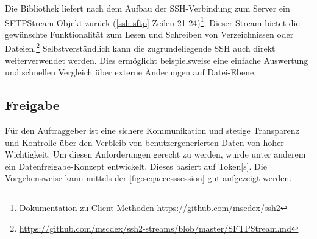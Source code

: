 

Die Bibliothek liefert nach dem Aufbau der \gls{SSH}-Verbindung zum Server ein \gls{SFTP}\gls{Stream}-Objekt zurück (\autoref{ssh-sftp} Zeilen 21-24)\footnote{Dokumentation zu Client-Methoden \url{https://github.com/mscdex/ssh2}}. Dieser \gls{Stream} bietet die gewünschte Funktionalität zum Lesen und Schreiben von Verzeichnissen oder Dateien.\footnote{\url{https://github.com/mscdex/ssh2-streams/blob/master/SFTPStream.md}} Selbstverständlich kann die zugrundeliegende \gls{SSH} auch direkt weiterverwendet werden. Dies ermöglicht beispielsweise eine einfache Auswertung und schnellen Vergleich über externe Änderungen auf Datei-Ebene.


\subsection{Freigabe}
Für den Auftraggeber ist eine sichere Kommunikation und stetige Transparenz und Kontrolle über den Verbleib von benutzergenerierten Daten von hoher Wichtigkeit. Um diesen Anforderungen gerecht zu werden, wurde unter anderem ein Datenfreigabe-Konzept entwickelt. Dieses basiert auf \gls{Token}[s]. Die Vorgehensweise kann mittels der \autoref{fig:seqaccesssession} gut aufgezeigt werden.

